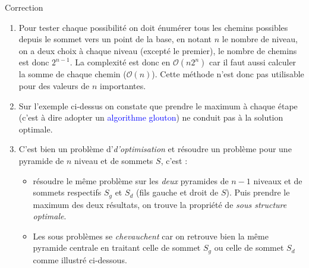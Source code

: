 \documentclass[10pt]{beamer}
\begin{document}
\begin{frame}{\Ctitle}{\stitle}
	\begin{exampleblock}{Correction}
		\addtocounter{enumi}{1}
		\begin{enumerate}
			\item<1->\textcolor{OliveGreen}{\small Pour tester chaque possibilité on doit énumérer tous les chemins possibles depuis le sommet vers un point de la base, en notant $n$ le nombre de niveau, on a deux choix à chaque niveau (excepté le premier), le nombre de chemins est donc $2^{n-1}$. La complexité est donc en $\mathcal{O}(n2^n)$ car il faut aussi calculer la somme de chaque chemin ($\mathcal{O}(n)$). Cette méthode n'est donc pas utilisable pour des valeurs de $n$ importantes.}
			\item<2->\textcolor{OliveGreen}{\small Sur l'exemple ci-dessus on constate que prendre le maximum à chaque étape (c'est à dire adopter un \textcolor{blue}{algorithme glouton}) ne conduit pas à la solution optimale.}
			\item<3->\textcolor{OliveGreen}{\small C'est bien un problème d'\textit{d'optimisation} et résoudre un problème pour une pyramide de $n$ niveau et de sommets $S$, c'est :}
			\begin{itemize}
				\item \textcolor{OliveGreen}{\small résoudre le même problème sur  les \textit{deux} pyramides de $n-1$ niveaux et de sommets respectifs $S_g$ et $S_d$ (fils gauche et droit de $S$). Puis prendre le maximum des deux résultats, on trouve la propriété de \textit{sous structure optimale}.}
				\item \textcolor{OliveGreen}{\small Les sous problèmes se \textit{chevauchent} car on retrouve bien la même pyramide centrale en traitant celle de sommet $S_g$ ou celle de sommet $S_d$ comme illustré ci-dessous.}
			\end{itemize}
		\end{enumerate}
	\end{exampleblock}
\end{frame}
\end{document}
